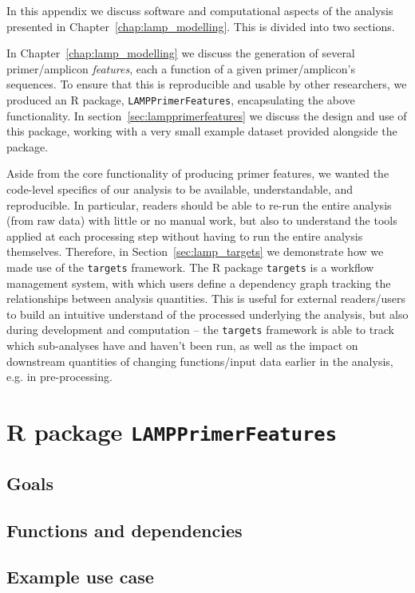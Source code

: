 \documentclass[../thesis.tex]{subfiles}
\begin{document}
In this appendix we discuss software and computational aspects of the analysis presented in Chapter~\ref{chap:lamp_modelling}. This is divided into two sections. 

In Chapter~\ref{chap:lamp_modelling} we discuss the generation of several primer/amplicon \emph{features}, each a function of a given primer/amplicon's sequences. To ensure that this is reproducible and usable by other researchers, we produced an R package, \texttt{LAMPPrimerFeatures}, encapsulating the above functionality. In section~\ref{sec:lampprimerfeatures} we discuss the design and use of this package, working with a very small example dataset provided alongside the package. 

Aside from the core functionality of producing primer features, we wanted the code-level specifics of our analysis to be available, understandable, and reproducible. In particular, readers should be able to re-run the entire analysis (from raw data) with little or no manual work, but also to understand the tools applied at each processing step without having to run the entire analysis themselves. Therefore, in Section~\ref{sec:lamp_targets} we demonstrate how we made use of the \texttt{targets} framework. The R package \texttt{targets} is a workflow management system, with which users define a dependency graph tracking the relationships between analysis quantities. This is useful for external readers/users to build an intuitive understand of the processed underlying the analysis, but also during development and computation -- the \texttt{targets} framework is able to track which sub-analyses have and haven't been run, as well as the impact on downstream quantities of changing functions/input data earlier in the analysis, e.g. in pre-processing.

\section{R package \texttt{LAMPPrimerFeatures} \label{sec:lampprimerfeatures}}

\subsection{Goals}

\subsection{Functions and dependencies}

\subsection{Example use case}
\end{document}
